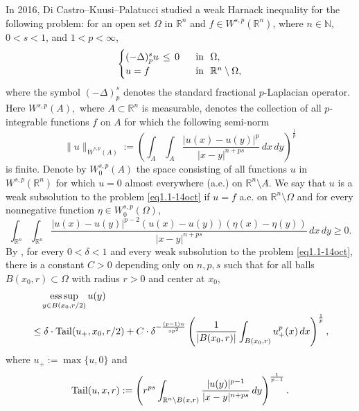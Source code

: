 \documentclass[11pt,leqno]{amsart}
\numberwithin{equation}{section}
\theoremstyle{definition}
\DeclareMathOperator*{\esssup}{ess\,sup}
\begin{document}
	In 2016, Di Castro--Kuusi--Palatucci \cite{DKP16} studied a weak Harnack inequality for the following problem:
	for an open set $\Omega$ in $\mathbb R^n$ and
	$f\in W^{s,p}(\mathbb R^n)$, where $n\in\mathbb N$, $0<s<1$, and $1<p<\infty$,
	\begin{equation}\label{eq1.1-14oct}
		\begin{cases}
			(-\Delta)^s_p u\, \leq\,  0&\ \ {\rm in\ \ }\Omega,\\
			u=f &\ \ {\rm in\ \ } \mathbb R^n\setminus\Omega,
		\end{cases}
	\end{equation}
	where the symbol $(-\Delta)^s_p$ denotes the standard fractional $p$-Laplacian operator.
	Here $W^{s,p}(A),$ where
	$A\subset\mathbb R^n$ is measurable, denotes  the collection of all $p$-integrable functions
	$f$ on $A$ for which the following semi-norm
	\[
	\|u\|_{\dot W^{s,p}(A)}:= \left(\int_{A}\int_{A}\frac{|u(x)-u(y)|^p}{|x-y|^{n+ps}}\,dx\,dy\right)^{\frac{1}{p}}
	\]
	is finite. Denote by $W^{s,p}_0(A)$ the space consisting of all functions $u$ in $W^{s,p}(\mathbb R^n)$ for which $u=0$
	almost everywhere (a.e.) on $\mathbb R^n\setminus A$. We say that $u$ is a weak subsolution to
	the problem \eqref{eq1.1-14oct} if $u=f$ a.e. on $\mathbb R^n\setminus\Omega$ and for every
	nonnegative function $\eta\in W^{s,p}_0(\Omega)$,
	\[
	\int_{\mathbb R^n}\int_{\mathbb R^n} \frac{|u(x)-u(y)|^{p-2}(u(x)-u(y))(\eta(x)-\eta(y))}{|x-y|^{n+ps}}\,dx\,dy\geq 0.
	\]
	By \cite[Theorem 1.1]{DKP16}, for every $0<\delta<1$ and
	every weak subsolution to the problem \eqref{eq1.1-14oct}, there is a constant $C>0$ depending only on $n,p,s$ such that for all balls $B(x_0,r)\subset\Omega$ with radius $r>0$ and center at $x_0$, 
	\begin{align*}
		&\quad \esssup_{y\in B(x_0,r/2)} u(y) \\
		&\leq \delta \cdot {\rm Tail}{(u_+,x_0,r/2)} + C\cdot \delta^{-\frac{(p-1)n}{sp^2}} \left( \frac{1}{|B(x_0,r)|}\int_{B(x_0,r)} u_+^p(x)\,dx \right)^{\frac{1}{p}},
	\end{align*}
	where $u_+:=\max\{u,0\}$ and 
	\[
	{\rm Tail}(u,x,r):= \left( r^{ps}\int_{\mathbb R^n\setminus B(x,r)} \frac{|u(y)|^{p-1}}{|x-y|^{n+ps}}\,dy \right)^{\frac{1}{p-1}}.
	\]
	
\end{document}
